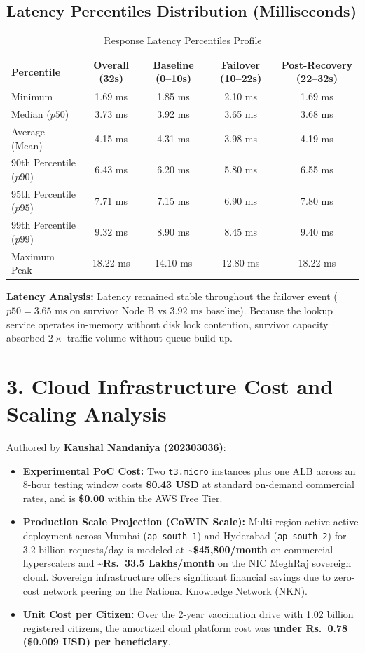 \documentclass[11pt,a4paper]{article}
\newcommand{\sectionline}[1]{\section*{\color{navy}#1}}
\begin{document}
\subsection*{Latency Percentiles Distribution (Milliseconds)}
\begin{table}[h]
\centering
\small
\begin{tabularx}{\textwidth}{@{}lcccc@{}}\toprule
\textbf{Percentile} & \textbf{Overall (32s)} & \textbf{Baseline (0--10s)} & \textbf{Failover (10--22s)} & \textbf{Post-Recovery (22--32s)}\\\midrule
Minimum & 1.69 ms & 1.85 ms & 2.10 ms & 1.69 ms\\
Median ($p50$) & 3.73 ms & 3.92 ms & 3.65 ms & 3.68 ms\\
Average (Mean) & 4.15 ms & 4.31 ms & 3.98 ms & 4.19 ms\\
90th Percentile ($p90$) & 6.43 ms & 6.20 ms & 5.80 ms & 6.55 ms\\
95th Percentile ($p95$) & 7.71 ms & 7.15 ms & 6.90 ms & 7.80 ms\\
99th Percentile ($p99$) & 9.32 ms & 8.90 ms & 8.45 ms & 9.40 ms\\
Maximum Peak & 18.22 ms & 14.10 ms & 12.80 ms & 18.22 ms\\\bottomrule
\end{tabularx}
\caption{Response Latency Percentiles Profile}
\end{table}

\textbf{Latency Analysis:} Latency remained stable throughout the failover event ($p50 = 3.65\text{ ms}$ on survivor Node B vs $3.92\text{ ms}$ baseline). Because the lookup service operates in-memory without disk lock contention, survivor capacity absorbed $2\times$ traffic volume without queue build-up.

\sectionline{3. Cloud Infrastructure Cost and Scaling Analysis}
Authored by \textbf{Kaushal Nandaniya (202303036)}:
\begin{itemize}
    \item \textbf{Experimental PoC Cost:} Two \texttt{t3.micro} instances plus one ALB across an 8-hour testing window costs \textbf{\$0.43 USD} at standard on-demand commercial rates, and is \textbf{\$0.00} within the AWS Free Tier.
    \item \textbf{Production Scale Projection (CoWIN Scale):} Multi-region active-active deployment across Mumbai (\texttt{ap-south-1}) and Hyderabad (\texttt{ap-south-2}) for 3.2 billion requests/day is modeled at \textbf{\~{}\$45,800/month} on commercial hyperscalers and \textbf{\~{}Rs.~33.5 Lakhs/month} on the NIC MeghRaj sovereign cloud. Sovereign infrastructure offers significant financial savings due to zero-cost network peering on the National Knowledge Network (NKN).
    \item \textbf{Unit Cost per Citizen:} Over the 2-year vaccination drive with 1.02 billion registered citizens, the amortized cloud platform cost was \textbf{under Rs.~0.78 (\$0.009 USD) per beneficiary}.
\end{itemize}
\end{document}
